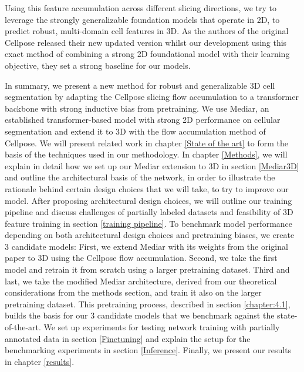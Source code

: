 Using this feature accumulation across different slicing directions, we try to leverage the strongly generalizable foundation models that operate in 2D, to predict robust, multi-domain cell features in 3D. As the authors of the original Cellpose released their new updated version whilst our development using this exact method of combining a strong 2D foundational model with their learning objective, they set a strong baseline for our models.

In summary, we present a new method for robust and generalizable 3D cell segmentation by adapting the Cellpose slicing flow accumulation to a transformer backbone with strong inductive bias from pretraining. We use Mediar, an established transformer-based model with strong 2D performance on cellular segmentation and extend it to 3D with the flow accumulation method of Cellpose. We will present related work in chapter \ref{State of the art} to form the basis of the techniques used in our methodology. In chapter \ref{Methods}, we will explain in detail how we set up our Mediar extension to 3D in section \ref{Mediar3D} and outline the architectural basis of the network, in order to illustrate the rationale behind certain design choices that we will take, to try to improve our model. After proposing architectural design choices, we will outline our training pipeline and discuss challenges of partially labeled datasets and feasibility of 3D feature training in section \ref{training pipeline}. To benchmark model performance depending on both architectural design choices and pretraining biases, we create 3 candidate models: First, we extend Mediar with its weights from the original paper to 3D using the Cellpose flow accumulation. Second, we take the first model and retrain it from scratch using a larger pretraining dataset. Third and last, we take the modified Mediar architecture, derived from our theoretical considerations from the methods section, and train it also on the larger pretraining dataset. This pretraining process, described in section \ref{chapter:4.1}, builds the basis for our 3 candidate models that we benchmark against the state-of-the-art. We set up experiments for testing network training with partially annotated data in section \ref{Finetuning} and explain the setup for the benchmarking experiments in section \ref{Inference}. Finally, we present our results in chapter \ref{results}.
